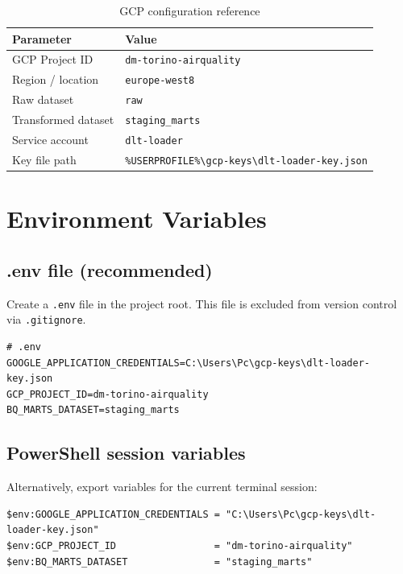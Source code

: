 \documentclass[11pt,a4paper]{article}
\begin{document}
\begin{table}[h!]
\centering
\caption{GCP configuration reference}
\small
{}
\begin{tabular}{@{}ll@{}}
\toprule
\textbf{Parameter} & \textbf{Value} \\
\midrule
GCP Project ID    & \texttt{dm-torino-airquality} \\
Region / location & \texttt{europe-west8} \\
Raw dataset       & \texttt{raw} \\
Transformed dataset & \texttt{staging\_marts} \\
Service account   & \texttt{dlt-loader} \\
Key file path     & \texttt{\%USERPROFILE\%\textbackslash gcp-keys\textbackslash dlt-loader-key.json} \\
\bottomrule
\end{tabular}
\end{table}

\section{Environment Variables}

\subsection{.env file (recommended)}

Create a \texttt{.env} file in the project root. This file is excluded from version control
via \texttt{.gitignore}.

\begin{lstlisting}[style=shell]
# .env
GOOGLE_APPLICATION_CREDENTIALS=C:\Users\Pc\gcp-keys\dlt-loader-key.json
GCP_PROJECT_ID=dm-torino-airquality
BQ_MARTS_DATASET=staging_marts
\end{lstlisting}

\subsection{PowerShell session variables}

Alternatively, export variables for the current terminal session:

\begin{lstlisting}[style=shell]
$env:GOOGLE_APPLICATION_CREDENTIALS = "C:\Users\Pc\gcp-keys\dlt-loader-key.json"
$env:GCP_PROJECT_ID                 = "dm-torino-airquality"
$env:BQ_MARTS_DATASET               = "staging_marts"
\end{lstlisting}
\end{document}
